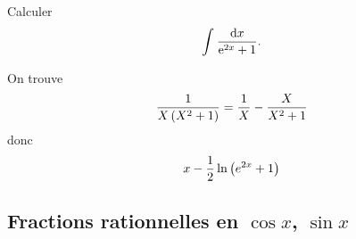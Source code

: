 \documentclass{magnolia}
\begin{document}
\begin{exoUnique}
\exo Calculer
  \[\priminv{\e^{2x}+1}{x}.\]
  \begin{sol}
  On trouve
  \[\frac{1}{X\p{X^2+1}}=\frac{1}{X}-\frac{X}{X^2+1}\]
  donc
  \[x-\frac{1}{2}\ln\p{e^{2x}+1}\]
  \end{sol}
\end{exoUnique}

\subsection{Fractions rationnelles en $\cos x$, $\sin x$}



\end{document}
